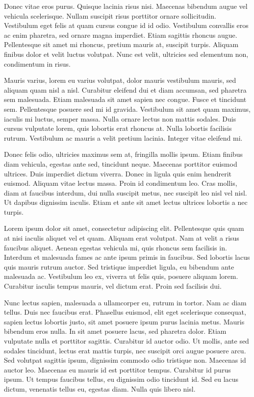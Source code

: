 \documentclass{UoYCSproject}
\begin{document}
\begin{summary}
Donec vitae eros purus. Quisque lacinia risus nisi. Maecenas bibendum augue vel vehicula scelerisque. Nullam suscipit risus porttitor ornare sollicitudin. Vestibulum eget felis at quam cursus congue id id odio. Vestibulum convallis eros ac enim pharetra, sed ornare magna imperdiet. Etiam sagittis rhoncus augue. Pellentesque sit amet mi rhoncus, pretium mauris at, suscipit turpis. Aliquam finibus dolor et velit luctus volutpat. Nunc est velit, ultricies sed elementum non, condimentum in risus.

Mauris varius, lorem eu varius volutpat, dolor mauris vestibulum mauris, sed aliquam quam nisl a nisl. Curabitur eleifend dui et diam accumsan, sed pharetra sem malesuada. Etiam malesuada sit amet sapien nec congue. Fusce et tincidunt sem. Pellentesque posuere sed mi id gravida. Vestibulum sit amet quam maximus, iaculis mi luctus, semper massa. Nulla ornare lectus non mattis sodales. Duis cursus vulputate lorem, quis lobortis erat rhoncus at. Nulla lobortis facilisis rutrum. Vestibulum ac mauris a velit pretium lacinia. Integer vitae eleifend mi.

Donec felis odio, ultricies maximus sem at, fringilla mollis ipsum. Etiam finibus diam vehicula, egestas ante sed, tincidunt neque. Maecenas porttitor euismod ultrices. Duis imperdiet dictum viverra. Donec in ligula quis enim hendrerit euismod. Aliquam vitae lectus massa. Proin id condimentum leo. Cras mollis, diam at faucibus interdum, dui nulla suscipit metus, nec suscipit leo nisl vel nisl. Ut dapibus dignissim iaculis. Etiam et ante sit amet lectus ultrices lobortis a nec turpis.

Lorem ipsum dolor sit amet, consectetur adipiscing elit. Pellentesque quis quam at nisi iaculis aliquet vel et quam. Aliquam erat volutpat. Nam at velit a risus faucibus aliquet. Aenean egestas vehicula mi, quis rhoncus sem facilisis in. Interdum et malesuada fames ac ante ipsum primis in faucibus. Sed lobortis lacus quis mauris rutrum auctor. Sed tristique imperdiet ligula, eu bibendum ante malesuada ac. Vestibulum leo ex, viverra ut felis quis, posuere aliquam lorem. Curabitur iaculis tempus mauris, vel dictum erat. Proin sed facilisis dui.

Nunc lectus sapien, malesuada a ullamcorper eu, rutrum in tortor. Nam ac diam tellus. Duis nec faucibus erat. Phasellus euismod, elit eget scelerisque consequat, sapien lectus lobortis justo, sit amet posuere ipsum purus lacinia metus. Mauris bibendum eros nulla. In sit amet posuere lacus, sed pharetra dolor. Etiam vulputate nulla et porttitor sagittis. Curabitur id auctor odio. Ut mollis, ante sed sodales tincidunt, lectus erat mattis turpis, nec suscipit orci augue posuere arcu. Sed volutpat sagittis ipsum, dignissim commodo odio tristique non. Maecenas id auctor leo. Maecenas eu mauris id est porttitor tempus. Curabitur id purus ipsum. Ut tempus faucibus tellus, eu dignissim odio tincidunt id. Sed eu lacus dictum, venenatis tellus eu, egestas diam. Nulla quis libero nisl.
\end{summary}
\end{document}
